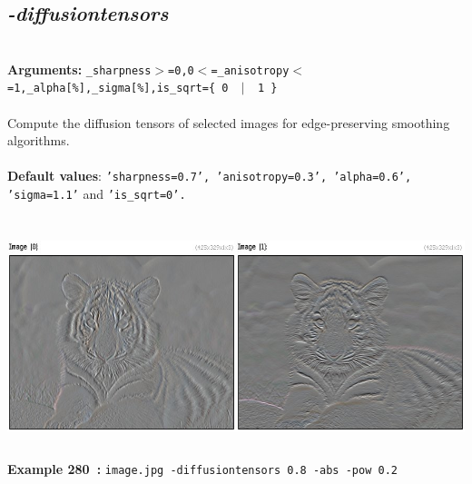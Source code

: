 \documentclass[a4paper,11pt,twoside]{book}
\begin{document}
\subsection{\emph{-diffusiontensors} }\vspace*{-0.5em}
~\\\textbf{Arguments: } 
{\small \texttt{\_sharpness$>$=0,0$<$=\_anisotropy$<$=1,\_alpha[\%],\_sigma[\%],is\_sqrt=\{ 0 ~$|$~ 1 \}}}\\~\\
Compute the diffusion tensors of selected images for edge-preserving smoothing algorithms.
~\\~\\\textbf{Default values}: {\small \texttt{'sharpness=0.7', 'anisotropy=0.3', 'alpha=0.6', 'sigma=1.1'} and \texttt{'is\_sqrt=0'.}}
\begin{center}\includegraphics[keepaspectratio=true,height=7cm,width=\textwidth]{img/gmic_def280.jpg}\\
{\footnotesize \textbf{Example 280~:} \texttt{image.jpg -diffusiontensors 0.8 -abs -pow 0.2}}
\end{center}
\end{document}

